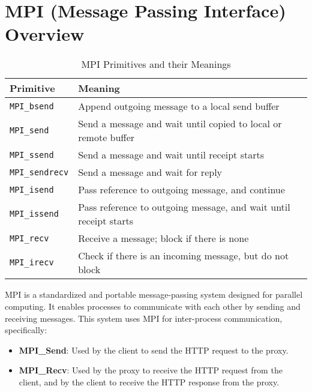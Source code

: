 \documentclass[a4paper,12pt]{article}
\begin{document}
\section{MPI (Message Passing Interface) Overview}
\begin{table}[h!]
\centering
\begin{tabular}{|l|l|}
\hline
\textbf{Primitive}    & \textbf{Meaning}                                                                   \\ \hline
\texttt{MPI\_bsend}    & Append outgoing message to a local send buffer                                    \\ \hline
\texttt{MPI\_send}     & Send a message and wait until copied to local or remote buffer                    \\ \hline
\texttt{MPI\_ssend}    & Send a message and wait until receipt starts                                      \\ \hline
\texttt{MPI\_sendrecv} & Send a message and wait for reply                                                 \\ \hline
\texttt{MPI\_isend}    & Pass reference to outgoing message, and continue                                  \\ \hline
\texttt{MPI\_issend}   & Pass reference to outgoing message, and wait until receipt starts                \\ \hline
\texttt{MPI\_recv}     & Receive a message; block if there is none                                         \\ \hline
\texttt{MPI\_irecv}    & Check if there is an incoming message, but do not block                           \\ \hline
\end{tabular}
\caption{MPI Primitives and their Meanings}
\label{table:mpi_primitives}
\end{table}
\noindent
MPI is a standardized and portable message-passing system designed for parallel computing. It enables processes to communicate with each other by sending and receiving messages. This system uses MPI for inter-process communication, specifically:
\begin{itemize}
    \item \textbf{MPI\_Send}: Used by the client to send the HTTP request to the proxy.
    \item \textbf{MPI\_Recv}: Used by the proxy to receive the HTTP request from the client, and by the client to receive the HTTP response from the proxy.
\end{itemize}
\end{document}
